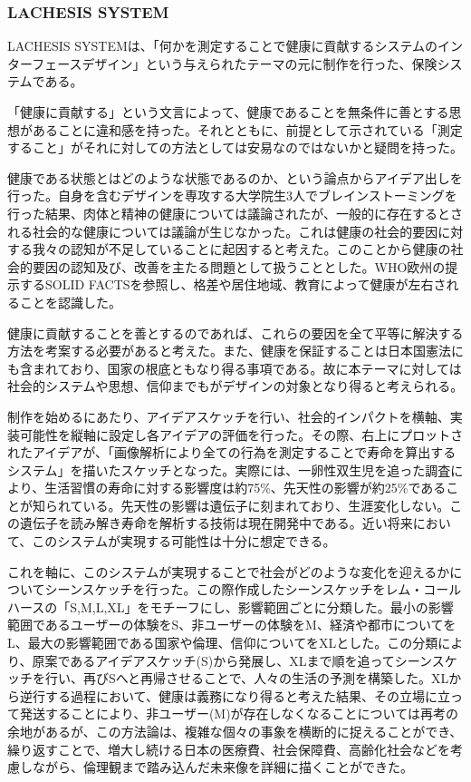 \documentclass{jsarticle}
\begin{document}
 \subsubsection{LACHESIS SYSTEM}
LACHESIS SYSTEMは、「何かを測定することで健康に貢献するシステムのインターフェースデザイン」という与えられたテーマの元に制作を行った、保険システムである。

「健康に貢献する」という文言によって、健康であることを無条件に善とする思想があることに違和感を持った。それとともに、前提として示されている「測定すること」がそれに対しての方法としては安易なのではないかと疑問を持った。

健康である状態とはどのような状態であるのか、という論点からアイデア出しを行った。自身を含むデザインを専攻する大学院生3人でブレインストーミングを行った結果、肉体と精神の健康については議論されたが、一般的に存在するとされる社会的な健康については議論が生じなかった。これは健康の社会的要因に対する我々の認知が不足していることに起因すると考えた。このことから健康の社会的要因の認知及び、改善を主たる問題として扱うこととした。WHO欧州の提示するSOLID FACTSを参照し、格差や居住地域、教育によって健康が左右されることを認識した。

健康に貢献することを善とするのであれば、これらの要因を全て平等に解決する方法を考案する必要があると考えた。また、健康を保証することは日本国憲法にも含まれており、国家の根底ともなり得る事項である。故に本テーマに対しては社会的システムや思想、信仰までもがデザインの対象となり得ると考えられる。

制作を始めるにあたり、アイデアスケッチを行い、社会的インパクトを横軸、実装可能性を縦軸に設定し各アイデアの評価を行った。その際、右上にプロットされたアイデアが、「画像解析により全ての行為を測定することで寿命を算出するシステム」を描いたスケッチとなった。実際には、一卵性双生児を追った調査により、生活習慣の寿命に対する影響度は約75\%、先天性の影響が約25\%であることが知られている。先天性の影響は遺伝子に刻まれており、生涯変化しない。この遺伝子を読み解き寿命を解析する技術は現在開発中である。近い将来において、このシステムが実現する可能性は十分に想定できる。

これを軸に、このシステムが実現することで社会がどのような変化を迎えるかについてシーンスケッチを行った。この際作成したシーンスケッチをレム・コールハースの「S,M,L,XL」をモチーフにし、影響範囲ごとに分類した。最小の影響範囲であるユーザーの体験をS、非ユーザーの体験をM、経済や都市についてをL、最大の影響範囲である国家や倫理、信仰についてをXLとした。この分類により、原案であるアイデアスケッチ(S)から発展し、XLまで順を追ってシーンスケッチを行い、再びSへと再帰させることで、人々の生活の予測を構築した。XLから逆行する過程において、健康は義務になり得ると考えた結果、その立場に立って発送することにより、非ユーザー(M)が存在しなくなることについては再考の余地があるが、この方法論は、複雑な個々の事象を横断的に捉えることができ、繰り返すことで、増大し続ける日本の医療費、社会保障費、高齢化社会などを考慮しながら、倫理観まで踏み込んだ未来像を詳細に描くことができた。
\end{document}
